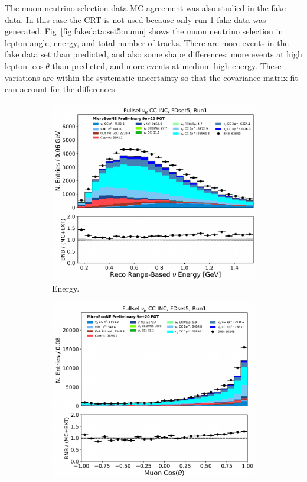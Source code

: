 The muon neutrino selection data-MC agreement was also studied in the fake data.  In this case the CRT is not used because only run 1 fake data was generated. 
Fig~\ref{fig:fakedata:set5:numu} shows the muon neutrino selection in lepton angle, energy, and total number of tracks. There are more events in the fake data set than predicted, and also some shape differences: more events at high lepton $\cos{\theta}$ than predicted, and more events at medium-high energy.  These variations are within the systematic uncertainty so that the covariance matrix fit can account for the differences.

\begin{figure}[H] 
\begin{center}
    \begin{subfigure}[b]{0.3\textwidth}
    \centering
    \includegraphics[width=1.00\textwidth]{Fakedata/set5/numu_energy.pdf}
    \caption{\label{fig:fakedata:set5:numu_energy} Energy.}
    \end{subfigure}
    \begin{subfigure}[b]{0.3\textwidth}
    \centering
    \includegraphics[width=1.00\textwidth]{Fakedata/set5/numu_costheta.pdf}

\end{subfigure}
\end{center}
\end{figure}
